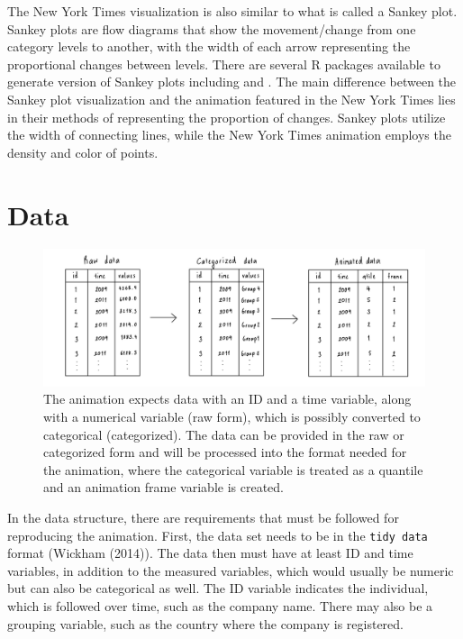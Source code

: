The New York Times visualization is also similar to what is called a Sankey plot. Sankey plots are flow diagrams that show the movement/change from one category levels to another, with the width of each arrow representing the proportional changes between levels. There are several R packages available to generate version of Sankey plots including  and . The main difference between the Sankey plot visualization and the animation featured in the New York Times lies in their methods of representing the proportion of changes. Sankey plots utilize the width of connecting lines, while the New York Times animation employs the density and color of points.

\hypertarget{data}{%
\section{Data}\label{data}}

\begin{figure}

{\centering \includegraphics[width=1\linewidth]{figures/data-diagram} 

}

\caption{The animation expects data with an ID and a time variable, along with a numerical variable (raw form), which is possibly converted to categorical (categorized). The data can be provided in the raw or categorized form and will be processed into the format needed for the animation, where the categorical variable is treated as a quantile and an animation frame variable is created.}\label{fig:data-diagram}
\end{figure}

In the data structure, there are requirements that must be followed for reproducing the animation. First, the data set needs to be in the \texttt{tidy\ data} format (Wickham (2014)). The data then must have at least ID and time variables, in addition to the measured variables, which would usually be numeric but can also be categorical as well. The ID variable indicates the individual, which is followed over time, such as the company name. There may also be a grouping variable, such as the country where the company is registered.

